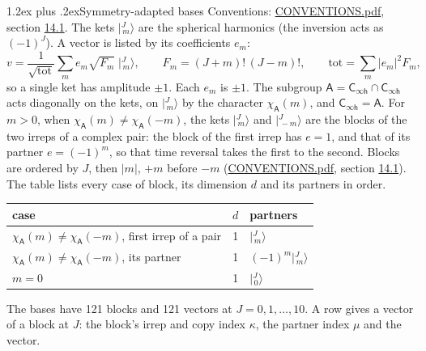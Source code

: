 \documentclass[10pt,a4paper]{article}
\makeatletter
\renewcommand\section{\@startsection{section}{1}{\z@}{-3ex plus -1ex minus -.2ex}%
  {1.2ex plus .2ex}{\normalfont\large\sffamily\bfseries\color{parttitle}}}
\numberwithin{equation}{section}
\newcommand{\grp}[1]{\mathsf{#1}}
\newcommand{\chiA}{\chi_{\grp{A}}}
\newcommand{\mult}{\kappa}
\newcommand{\intx}{\mu}
\newcommand{\jm}[2]{\bigl\lvert{}^{#1}_{\,#2}\bigr\rangle}
\makeatother
\begin{document}
\section{Symmetry-adapted bases}\label{s:bases}
Conventions: \href{../../CONVENTIONS.pdf}{CONVENTIONS.pdf}, section \href{../../CONVENTIONS.pdf\#conv.14.1}{14.1}.
\leavevmode\label{n:index.m}\label{n:vector.ket}The kets $\jm{J}{m}$ are the spherical harmonics (the inversion acts as $(-1)^J$). \label{n:index.ketcoefficient}\label{n:vector.basis.symmetry}\label{n:index.ketweight}\label{n:index.total}A vector is listed by its coefficients $e_m$:
\begin{equation}\label{e:ket}v = \frac{1}{\sqrt{\mathrm{tot}}}\sum_m e_m\sqrt{F_m}\;\jm{J}{m},\qquad F_m = (J+m)!\,(J-m)!,\qquad \mathrm{tot} = \sum_m |e_m|^2F_m,\end{equation}
so a single ket has amplitude $\pm1$. Each $e_m$ is $\pm1$.
\leavevmode\label{n:group.A}\label{n:function.character.abelian}The subgroup $\grp{A} = \grp{C_{\infty h}}\cap\grp{C_{\infty h}}$ acts diagonally on the kets, on $\jm{J}{m}$ by the character $\chiA(m)$, and $\grp{C_{\infty h}} = \grp{A}$. For $m > 0$, when $\chiA(m) \ne \chiA(-m)$, the kets $\jm{J}{m}$ and $\jm{J}{-m}$ are the blocks of the two irreps of a complex pair: the block of the first irrep has $e = 1$, and that of its partner $e = (-1)^m$, so that time reversal takes the first to the second. Blocks are ordered by $J$, then $|m|$, $+m$ before $-m$ (\href{../../CONVENTIONS.pdf}{CONVENTIONS.pdf}, section \href{../../CONVENTIONS.pdf\#conv.14.1}{14.1}).
\leavevmode\label{n:head.case}\label{n:head.partners}The table lists every case of block, its dimension $d$ and its partners in order.
\begin{center}\begin{tabular}{@{}lrl@{}}\toprule
case & $d$ & partners\\\midrule
$\chiA(m) \ne \chiA(-m)$, first irrep of a pair & 1 & $\jm{J}{m}$\\
$\chiA(m) \ne \chiA(-m)$, its partner & 1 & $(-1)^m\jm{J}{m}$\\
$m = 0$ & 1 & $\jm{J}{0}$\\
\bottomrule\end{tabular}\end{center}
The bases have 121 blocks and 121 vectors at $J = 0, 1, \dots, 10$. \label{n:index.copy}\label{n:head.irrep}\label{n:head.vector}A row gives a vector of a block at $J$: the block's irrep and copy index $\mult$, the partner index $\intx$ and the vector.
\end{document}
